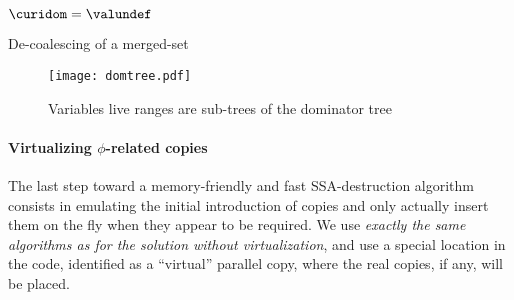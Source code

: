 \begin{algorithm}[h]
$\curidom=\valundef$\;
\BlankLine
\BlankLine
{}
\caption{\label{alg:alternative_ssa_destruction:domup} De-coalescing of 
a merged-set}
\end{algorithm}

\begin{figure}
\texttt{[image: domtree.pdf]}
\caption{\label{fig:alternative_ssa_destruction:fig:domtree}Variables live ranges are sub-trees of the dominator tree}
\end{figure}


\paragraph{Virtualizing $\phi$-related copies}
The last step toward a memory-friendly and fast SSA-destruction algorithm consists in emulating the initial introduction of copies and only actually insert them on the fly when they appear to be required. 
We use \emph{exactly the same algorithms as for the solution without virtualization}, and use a special location in the code, identified as a ``virtual'' parallel copy, where the real copies, if any, will be placed.

